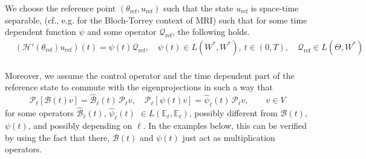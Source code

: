 \documentclass[12pt]{article}
\newcommand\uld[1]{\underline{d#1}}
\newcommand\BB{\mathcal{B}}
\newcommand\HH{\mathcal{H}}
\newcommand\Proj{\mathcal{P}}
\newcommand\ellnew{\ell}
\newcommand\hrefprime{\mathcal{Q}_{\text{ref}}}
\begin{document}
We choose the reference point $(\theta_{\text{ref}},u_{\text{ref}})$ such that the state $u_{\text{ref}}$ is space-time separable, (cf., e.g. \cite{MRI-uniqueness} for the Bloch-Torrey context of MRI) such that for some time dependent function $\psi$ and some operator $\hrefprime$, the following holds. 
\begin{equation}\label{spacetimeseparable}
\begin{aligned}
&(\HH'(\theta_{\text{ref}})u_{\text{ref}})(t)=\psi(t)\hrefprime, \quad 
\psi(t)\in L(W^*,W^*),\ t\in(0,T),\quad \hrefprime\in L(\Theta,W^*)\\ 
\end{aligned}
\end{equation}

 
Moreover, we assume the control operator and the time dependent part of the reference state to 
commute with the eigenprojections in such a way that 
\begin{equation}\label{commBpsi}
\Proj_\ell[\BB(t) v]=\hat{\BB}_\ellnew(t)\,\Proj_\ell v, \quad
\Proj_\ell[\psi(t)v]=\hat{\psi}_\ellnew(t)\,\Proj_\ell v, \qquad v\in V
\end{equation}
for some operators $\hat{\BB}_\ellnew(t)$, $\hat{\psi}_\ellnew(t)$ $\in L(\mathbb{E}_\ell,\mathbb{E}_\ell)$, possibly different from $\BB(t)$, $\psi(t)$, and possibly depending on $\ellnew$.
In the examples below, this can be verified by using the fact that there, $\BB(t)$ and $\psi(t)$ just act as multiplication operators.
\end{document}
